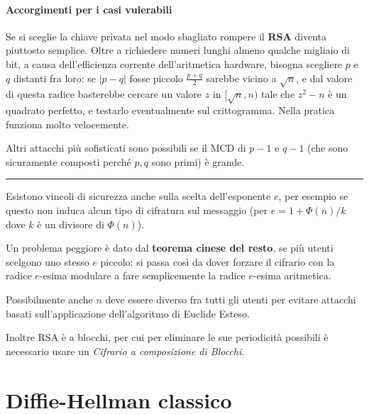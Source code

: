 \documentclass{article}
\begin{document}
\paragraph{Accorgimenti per i casi vulerabili}

Se si sceglie la chiave privata nel modo sbagliato rompere il \textbf{RSA} diventa piuttosto semplice. Oltre a richiedere numeri lunghi almeno qualche migliaio di bit, a causa dell'efficienza corrente dell'aritmetica hardware, bisogna scegliere $p$ e $q$ distanti fra loro: se $|p-q|$ fosse piccolo $\frac{p+q}{2}$ sarebbe vicino a $\sqrt{n}$, e dal valore di questa radice basterebbe cercare un valore $z$ in $[\sqrt{n},n)$ tale che $z^2-n$ è un quadrato perfetto, e testarlo eventualmente sul crittogramma. Nella pratica funziona molto velocemente.

Altri attacchi più sofisticati sono possibili se il MCD di $p-1$ e $q-1$ (che sono sicuramente composti perché $p,q$ sono primi) è grande.


\hrule


Esistono vincoli di sicurezza anche sulla scelta dell'esponente $e$, per esempio se questo non induca alcun tipo di cifratura sul messaggio (per $e=1+\Phi(n)/k$ dove $k$ è un divisore di $\Phi(n)$).

Un problema peggiore è dato dal \textbf{teorema cinese del resto}, se più utenti scelgono uno stesso $e$ piccolo: si passa così da dover forzare il cifrario con la radice $e$-esima modulare a fare semplicemente la radice $e$-esima aritmetica.

Possibilmente anche $n$ deve essere diverso fra tutti gli utenti per evitare attacchi basati sull'applicazione dell'algoritmo di Euclide Esteso.

Inoltre RSA è a blocchi, per cui per eliminare le sue periodicità possibili è necessario usare un \textit{Cifrario a composizione di Blocchi}.


\section{Diffie-Hellman classico}
\end{document}
